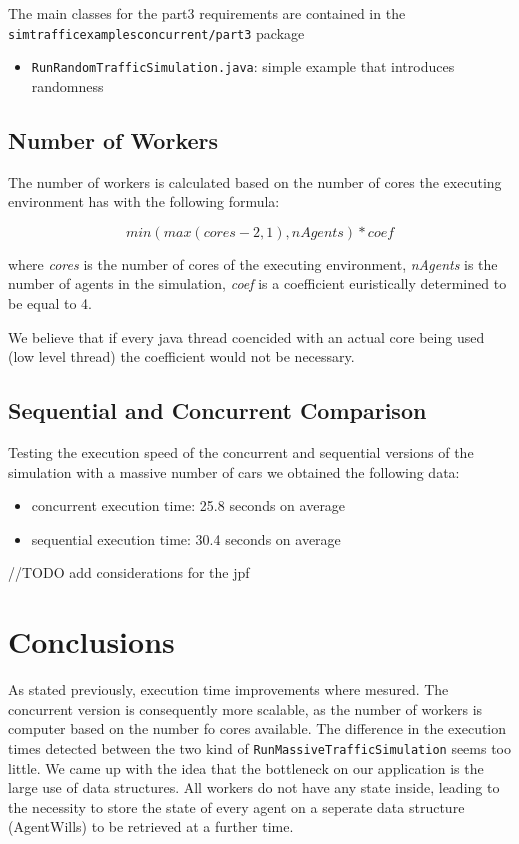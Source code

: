 \documentclass[12pt, a4paper]{report}
\begin{document}
The main classes for the part3 requirements are contained in the\\ \texttt{simtrafficexamplesconcurrent/part3} package
\begin{itemize}
    \item \texttt{RunRandomTrafficSimulation.java}: simple example that introduces randomness
\end{itemize}

\section{Number of Workers}
The number of workers  is calculated based on the number of cores the executing environment has with the following
 formula:

\[min(max(cores - 2, 1), nAgents) * coef\]

where \emph{cores} is the number of cores of the executing environment, \emph{nAgents} is the number of agents in the simulation,
 \emph{coef} is a coefficient euristically determined to be equal to 4.

We believe that if every java thread coencided with an actual core being used (low level thread) the coefficient
 would not be necessary. 

\section{Sequential and Concurrent Comparison}
Testing the execution speed of the concurrent and sequential versions of the simulation with a massive number of cars
 we obtained the following data:
\begin{itemize}
    \item concurrent execution time: 25.8 seconds on average
    \item sequential execution time: 30.4 seconds on average
\end{itemize}

//TODO add considerations for the jpf
\chapter{Conclusions}
As stated previously, execution time improvements where mesured. The concurrent version is consequently more scalable, as the number of workers is computer based on the number fo cores available. The difference in the execution times detected between the two kind of \texttt{RunMassiveTrafficSimulation} seems too little. We came up with the idea that the bottleneck on our application is the large use of data structures. All workers do not have any state inside, leading to the necessity to store the state of every agent on a seperate data structure (AgentWills) to be retrieved at a further time.



\end{document}
